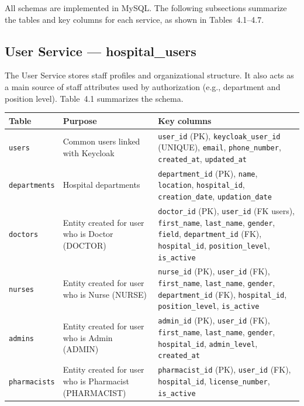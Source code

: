 All schemas are implemented in MySQL. The following subsections summarize the tables and key columns for each service, as shown in Tables~4.1--4.7.


\subsection{User Service — hospital\_users}
The User Service stores staff profiles and organizational structure. It also acts as a main source of staff attributes used by authorization (e.g., department and position level). Table~4.1 summarizes the schema.
\begin{table}[H]
\centering
\renewcommand{\arraystretch}{1.2}
\begin{tabular}{|p{3.2cm}|p{5.6cm}|p{5.6cm}|}
\hline
\textbf{Table} & \textbf{Purpose} & \textbf{Key columns} \\
\hline
\texttt{users} &
Common users linked with Keycloak &
\texttt{user\_id} (PK), \texttt{keycloak\_user\_id} (UNIQUE), \texttt{email}, \texttt{phone\_number}, \texttt{created\_at}, \texttt{updated\_at} \\
\hline
\texttt{departments} &
Hospital departments &
\texttt{department\_id} (PK), \texttt{name}, \texttt{location}, \texttt{hospital\_id}, \texttt{creation\_date}, \texttt{updation\_date} \\
\hline
\texttt{doctors} & Entity created for user who is
Doctor (DOCTOR) &
\texttt{doctor\_id} (PK), \texttt{user\_id} (FK \textrightarrow{} users), \texttt{first\_name}, \texttt{last\_name}, \texttt{gender}, \texttt{field}, \texttt{department\_id} (FK), \texttt{hospital\_id}, \texttt{position\_level}, \texttt{is\_active}\\
\hline
\texttt{nurses} &
Entity created for user who is Nurse (NURSE) &
\texttt{nurse\_id} (PK), \texttt{user\_id} (FK), \texttt{first\_name}, \texttt{last\_name}, \texttt{gender}, \texttt{department\_id} (FK), \texttt{hospital\_id}, \texttt{position\_level}, \texttt{is\_active} \\
\hline
\texttt{admins} &
Entity created for user who is Admin (ADMIN) &
\texttt{admin\_id} (PK), \texttt{user\_id} (FK), \texttt{first\_name}, \texttt{last\_name}, \texttt{gender}, \texttt{hospital\_id}, \texttt{admin\_level}, \texttt{created\_at} \\
\hline
        \texttt{pharmacists} &
    Entity created for user who is Pharmacist (PHARMACIST) &
    \texttt{pharmacist\_id} (PK), \texttt{user\_id} (FK), \texttt{hospital\_id}, \texttt{license\_number}, \texttt{is\_active} \\

\end{tabular}
\end{table}
